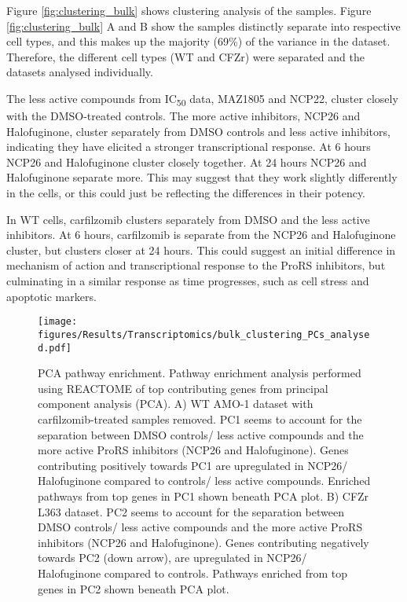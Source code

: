 Figure \ref{fig:clustering_bulk} shows clustering analysis of the samples.
Figure \ref{fig:clustering_bulk} A and B show the samples distinctly separate into respective cell types, and this makes up the majority (69\%) of the variance in the dataset.
Therefore, the different cell types (WT and CFZr) were separated and the datasets analysed individually.

The less active compounds from IC\textsubscript{50} data, MAZ1805 and NCP22, cluster closely with the DMSO-treated controls.
The more active inhibitors, NCP26 and Halofuginone, cluster separately from DMSO controls and less active inhibitors, indicating they have elicited a stronger transcriptional response.
At 6 hours NCP26 and Halofuginone cluster closely together.
At 24 hours NCP26 and Halofuginone separate more.
This may suggest that they work slightly differently in the cells, or this could just be reflecting the differences in their potency.

In WT cells, carfilzomib clusters separately from DMSO and the less active inhibitors.
At 6 hours, carfilzomib is separate from the NCP26 and Halofuginone cluster, but clusters closer at 24 hours.
This could suggest an initial difference in mechanism of action and transcriptional response to the ProRS inhibitors, but culminating in a similar response as time progresses, such as cell stress and apoptotic markers.

\begin{figure}[htb]
\centering
\texttt{[image: figures/Results/Transcriptomics/bulk\_clustering\_PCs\_analysed.pdf]}
\caption[PCA pathway enrichment]{PCA pathway enrichment.
Pathway enrichment analysis performed using REACTOME of top contributing genes from principal component analysis (PCA).
A) WT AMO-1 dataset with carfilzomib-treated samples removed.
PC1 seems to account for the separation between DMSO controls/ less active compounds and the more active ProRS inhibitors (NCP26 and Halofuginone).
Genes contributing positively towards PC1 are upregulated in NCP26/ Halofuginone compared to controls/ less active compounds.
Enriched pathways from top genes in PC1 shown beneath PCA plot.
B) CFZr L363 dataset.
PC2 seems to account for the separation between DMSO controls/ less active compounds and the more active ProRS inhibitors (NCP26 and Halofuginone).
Genes contributing negatively towards PC2 (down arrow), are upregulated in NCP26/ Halofuginone compared to controls.
Pathways enriched from top genes in PC2 shown beneath PCA plot.}
\label{fig:pca_pathway}
\end{figure}


